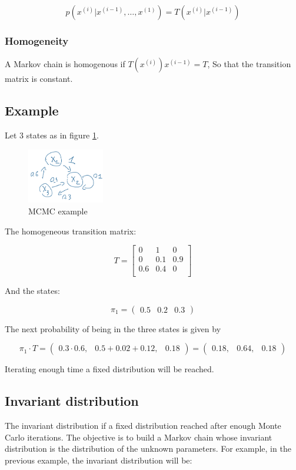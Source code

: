   $$p(x^{(i)}|x^{(i-1)},\dots,x^{(1)})=T(x^{(i)}|x^{(i-1)})$$

    \subsubsection{Homogeneity}
    A Markov chain is homogenous if $T(x^{(i)})x^{(i-1)}=T$,
    So that the transition matrix is constant.

  \subsection{Example}
  Let $3$ states as in figure \ref{fig:MCMCexample}.

  \begin{figure}[H]
    \centering
    \includegraphics[width=0.3\textwidth]{mcmc.png}
    \caption{MCMC example}
    \label{fig:MCMCexample}
  \end{figure}

  The homogeneous transition matrix:

  $$T = \begin{bmatrix}0 & 1 & 0\\0 & 0.1 & 0.9\\ 0.6 & 0.4 & 0\\\end{bmatrix}$$

  And the states:

  $$\pi_1=\begin{pmatrix}0.5 & 0.2& 0.3 \end{pmatrix}$$

  The next probability of being in the three states is given by

  $$\pi_1 \cdot T=\begin{pmatrix}0.3\cdot0.6, & 0.5+0.02+0.12,& 0.18 \end{pmatrix} = \begin{pmatrix}0.18, & 0.64,& 0.18 \end{pmatrix}$$

  Iterating enough time a fixed distribution will be reached.

  \subsection{Invariant distribution}
  The invariant distribution if a fixed distribution reached after enough Monte Carlo iterations.
  The objective is to build a Markov chain whose invariant distribution is the distribution of the unknown parameters.
  For example, in the previous example, the invariant distribution will be:

